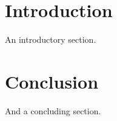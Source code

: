 \documentclass{article}
\begin{document}
\section{Introduction}
An introductory section.
 \section{Conclusion}
And a concluding section.
\end{document}
